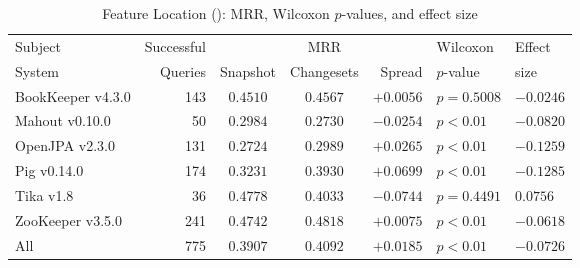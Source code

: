 \begin{table}[t]
\centering
\caption{Feature Location (\fone): MRR, Wilcoxon $p$-values, and effect size}
\begin{tabular}{l|r|ccr|ll}
\toprule
Subject & Successful &    & MRR &        & Wilcoxon  & Effect \\
System  & Queries    & Snapshot & Changesets  & Spread & $p$-value & size \\
\midrule
BookKeeper v4.3.0 & 143 & $0.4510$ & $\bm{0.4567}$ & $+0.0056$ & $p = 0.5008$ & $-0.0246$ \\
Mahout v0.10.0 & 50 & $\bm{0.2984}$ & $0.2730$ & $-0.0254$ & $p < 0.01$ & $-0.0820$ \\
OpenJPA v2.3.0 & 131 & $0.2724$ & $\bm{0.2989}$ & $+0.0265$ & $p < 0.01$ & $-0.1259$ \\
Pig v0.14.0 & 174 & $0.3231$ & $\bm{0.3930}$ & $+0.0699$ & $p < 0.01$ & $-0.1285$ \\
Tika v1.8 & 36 & $\bm{0.4778}$ & $0.4033$ & $-0.0744$ & $p = 0.4491$ & $0.0756$ \\
ZooKeeper v3.5.0 & 241 & $0.4742$ & $\bm{0.4818}$ & $+0.0075$ & $p < 0.01$ & $-0.0618$ \\
\midrule
All & 775 & $0.3907$ & $\bm{0.4092}$ & $+0.0185$ & $p < 0.01$ & $-0.0726$ \\
\bottomrule
\end{tabular}
\label{table:feature_location_rq1}
\end{table}

